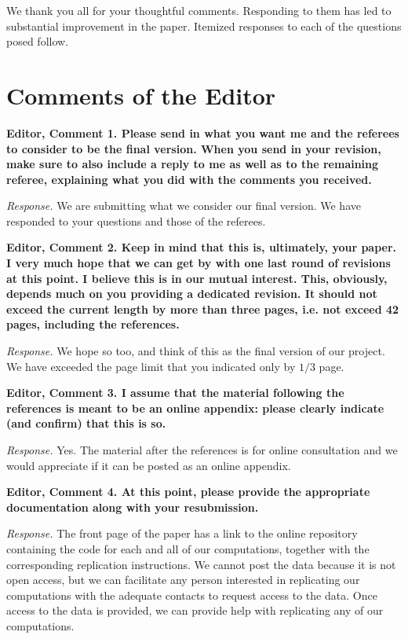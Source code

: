 \restoregeometry
\doublespacing

\noindent We thank you all for your thoughtful comments. Responding to them has led to substantial improvement in the paper. Itemized responses to each of the questions posed follow.

\section*{Comments of the Editor}

\noindent \textbf{Editor, Comment 1. Please send in what you want me and the referees to consider to be the final version. When you send in your revision, make sure to also include a reply to me as well as to the remaining referee, explaining what you did with the comments you received.}

\noindent \textit{Response.} We are submitting what we consider our final version. We have responded to your questions and those of the referees.

\noindent \textbf{Editor, Comment 2. Keep in mind that this is, ultimately, your paper. I very much hope that we can get by with one last round of revisions at this point. I believe this is in our mutual interest. This, obviously, depends much on you providing a dedicated revision. It should not exceed the current length by more than three pages, i.e. not exceed 42 pages, including the references.}

\noindent \textit{Response.} We hope so too, and think of this as the final version of our project. We have exceeded the page limit that you indicated only by $1/3$ page.

\noindent \textbf{Editor, Comment 3. I assume that the material following the references is meant to be an online appendix: please clearly indicate (and confirm) that this is so.}

\noindent \textit{Response.} Yes. The material after the references is for online consultation and we would appreciate if it can be posted as an online appendix.

\noindent \textbf{Editor, Comment 4. At this point, please provide the appropriate documentation along with your resubmission.}

\noindent \textit{Response.} The front page of the paper has a link to the online repository containing the code for each and all of our computations, together with the corresponding replication instructions. We cannot post the data because it is not open access, but we can facilitate any person interested in replicating our computations with the adequate contacts to request access to the data. Once access to the data is provided, we can provide help with replicating any of our computations.


